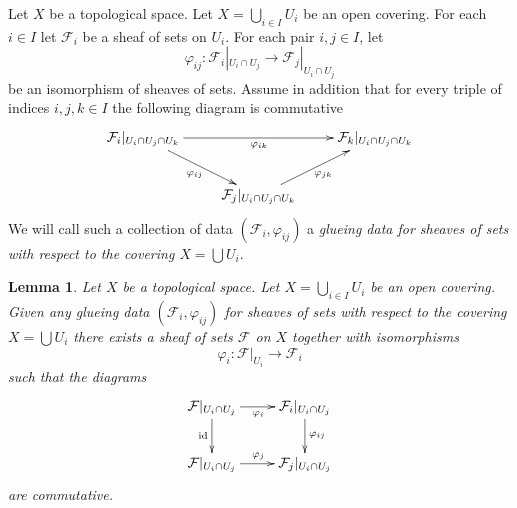 \documentclass{stacks-project}
\theoremstyle{plain}
\newtheorem{lemma}[subsection]{Lemma}
\theoremstyle{definition}
\theoremstyle{remark}
\numberwithin{equation}{subsection}
\begin{document}
\medskip\noindent
Let $X$ be a topological space.
Let $X = \bigcup_{i\in I} U_i$ be an open covering.
For each $i \in I$ let $\mathcal{F}_i$ be a sheaf of sets on $U_i$.
For each pair $i, j \in I$, let
$$
\varphi_{ij} :
\mathcal{F}_i|_{U_i \cap U_j}
\longrightarrow
\mathcal{F}_j|_{U_i \cap U_j}
$$
be an isomorphism of sheaves of sets. Assume in addition
that for every triple of indices $i, j, k \in I$ the
following diagram is commutative
$$
\xymatrix{
\mathcal{F}_i|_{U_i \cap U_j \cap U_k}
\ar[rr]_{\varphi_{ik}}
\ar[rd]_{\varphi_{ij}} & &
\mathcal{F}_k|_{U_i \cap U_j \cap U_k} \\
&
\mathcal{F}_j|_{U_i \cap U_j \cap U_k}
\ar[ru]_{\varphi_{jk}}
}
$$
We will call such a collection of data
$(\mathcal{F}_i, \varphi_{ij})$
a {\it glueing data for sheaves of sets with respect to
the covering $X = \bigcup U_i$}.

\begin{lemma}
\label{lemma-glue-sheaves}
Let $X$ be a topological space.
Let $X = \bigcup_{i\in I} U_i$ be an open covering.
Given any glueing data $(\mathcal{F}_i, \varphi_{ij})$
for sheaves of sets with respect to the covering $X = \bigcup U_i$
there exists a sheaf of sets $\mathcal{F}$ on $X$
together with isomorphisms
$$
\varphi_i : \mathcal{F}|_{U_i} \to \mathcal{F}_i
$$
such that the diagrams
$$
\xymatrix{
\mathcal{F}|_{U_i \cap U_j} \ar[r]_{\varphi_i} \ar[d]_{\text{id}} &
\mathcal{F}_i|_{U_i \cap U_j} \ar[d]^{\varphi_{ij}} \\
\mathcal{F}|_{U_i \cap U_j} \ar[r]^{\varphi_j} &
\mathcal{F}_j|_{U_i \cap U_j}
}
$$
are commutative.
\end{lemma}
\end{document}
